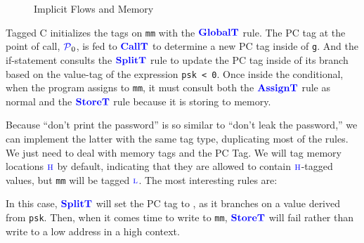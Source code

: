\documentclass{llncs}
\begin{document}
\begin{figure}
\caption{Implicit Flows and Memory}
\label{fig:ex2}
\end{figure}

Tagged C initializes the tags on {\tt mm} with the \(\color{blue} \mathbf{GlobalT}\) rule. The PC tag
at the point of call, \(\mathcal{\color{blue} P\mathit{}}_0\), is fed to \(\color{blue} \mathbf{CallT}\) to determine a new PC tag
inside of {\tt g}. And the if-statement consults the \(\color{blue} \mathbf{SplitT}\) rule to update the PC tag
inside of its branch based on the value-tag of the expression {\tt psk < 0}. Once inside the
conditional, when the program assigns to {\tt mm}, it must consult both the
\(\color{blue} \mathbf{AssignT}\) rule as normal and the \(\color{blue} \mathbf{StoreT}\) rule because it is storing
to memory.

Because ``don't print the password'' is so similar to ``don't leak the password,'' we can
implement the latter with the same tag type, duplicating most of the rules. We just need to
deal with memory tags and the PC Tag. We will tag memory
locations \(\textnormal{\color{blue} \sc h}\) by default, indicating that they are allowed to contain \(\textnormal{\color{blue} \sc h}\)-tagged values,
but {\tt mm} will be tagged \(\textnormal{\color{blue} \sc l}\). The most interesting rules are:

\begin{figure}
\end{figure}

In this case, \(\color{blue} \mathbf{SplitT}\) will set the PC tag to \high, as it branches on a value derived from {\tt psk}.
Then, when it comes time to write to {\tt mm}, \(\color{blue} \mathbf{StoreT}\) will fail rather than write to a low address
in a high context.
\end{document}
